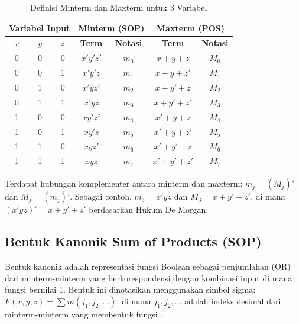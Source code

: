 \begin{table}[H]
\centering
\small
\renewcommand{\arraystretch}{1.2}
\begin{tabular}{|c|c|c||c|c||c|c|}
\hline
\multicolumn{3}{|c||}{\textbf{Variabel Input}} & \multicolumn{2}{c||}{\textbf{Minterm (SOP)}} & \multicolumn{2}{c|}{\textbf{Maxterm (POS)}} \\ \hline
$x$ & $y$ & $z$ & \textbf{Term} & \textbf{Notasi} & \textbf{Term} & \textbf{Notasi} \\ \hline
0 & 0 & 0 & $x'y'z'$ & $m_0$ & $x+y+z$ & $M_0$ \\ \hline
0 & 0 & 1 & $x'y'z$ & $m_1$ & $x+y+z'$ & $M_1$ \\ \hline
0 & 1 & 0 & $x'yz'$ & $m_2$ & $x+y'+z$ & $M_2$ \\ \hline
0 & 1 & 1 & $x'yz$ & $m_3$ & $x+y'+z'$ & $M_3$ \\ \hline
1 & 0 & 0 & $xy'z'$ & $m_4$ & $x'+y+z$ & $M_4$ \\ \hline
1 & 0 & 1 & $xy'z$ & $m_5$ & $x'+y+z'$ & $M_5$ \\ \hline
1 & 1 & 0 & $xyz'$ & $m_6$ & $x'+y'+z$ & $M_6$ \\ \hline
1 & 1 & 1 & $xyz$ & $m_7$ & $x'+y'+z'$ & $M_7$ \\ \hline
\end{tabular}
\caption{Definisi Minterm dan Maxterm untuk 3 Variabel}
\label{tab:minterm-maxterm-lengkap}
\end{table}

\begin{catatan}
Terdapat hubungan komplementer antara minterm dan maxterm: $m_j = (M_j)'$ dan $M_j = (m_j)'$. Sebagai contoh, $m_3 = x'yz$ dan $M_3 = x + y' + z'$, di mana $(x'yz)' = x + y' + z'$ berdasarkan Hukum De Morgan.
\end{catatan}

\subsection{Bentuk Kanonik Sum of Products (SOP)}

\begin{definisi}
Bentuk kanonik  adalah representasi fungsi Boolean sebagai penjumlahan (OR) dari minterm-minterm yang berkorespondensi dengan kombinasi input di mana fungsi bernilai 1. Bentuk ini dinotasikan menggunakan simbol sigma: $F(x, y, z) = \sum m(j_1, j_2, \ldots)$, di mana $j_1, j_2, \ldots$ adalah indeks desimal dari minterm-minterm yang membentuk fungsi \cite{geeksforgeeks_sop_pos}.
\end{definisi}

